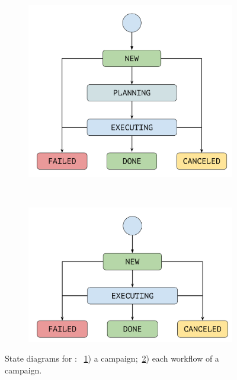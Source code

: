 \begin{figure}[t]
    \centering
    \begin{subfigure}[b]{0.45\textwidth}
        \includegraphics[width=.95\textwidth]{figures/manager/campaign-state-model.pdf}
        \caption{}
        \label{fig:CampaignStates}
    \end{subfigure}
    ~ 
    \begin{subfigure}[b]{0.45\textwidth}
        \includegraphics[width=.95\textwidth]{figures/manager/workflow-state-model.pdf}
        \caption{}
        \label{fig:WorkflowStates}
    \end{subfigure}
    \caption{State diagrams for : ~\ref{fig:CampaignStates}) a campaign;~\ref{fig:WorkflowStates}) each workflow of a campaign.}
    \label{fig:StateDiagrams}
\end{figure}

